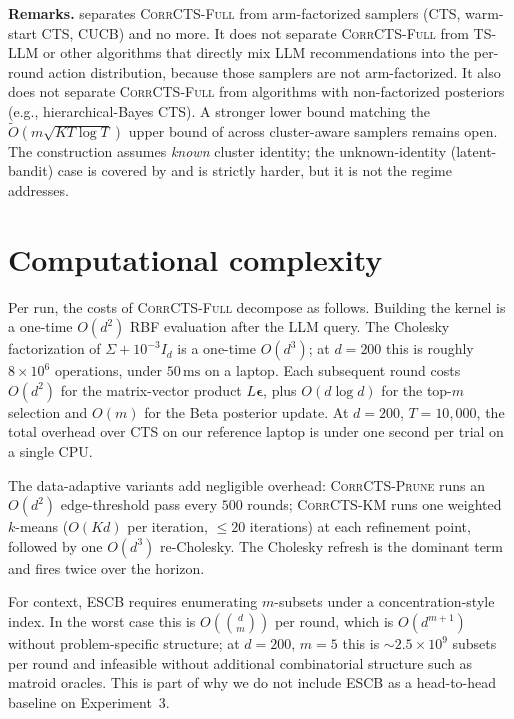 \documentclass{article}
\theoremstyle{plain}
\theoremstyle{definition}
\theoremstyle{remark}
\newcommand{\CorrFull}{\textsc{CorrCTS-Full}}
\newcommand{\EdgePrune}{\textsc{CorrCTS-Prune}}
\newcommand{\KMRefine}{\textsc{CorrCTS-KM}}
\begin{document}
\textbf{Remarks.}
 separates \CorrFull{} from arm-factorized samplers (CTS, warm-start CTS, CUCB) and no more.
It does not separate \CorrFull{} from TS-LLM or other algorithms that directly mix LLM recommendations into the per-round action distribution, because those samplers are not arm-factorized.
It also does not separate \CorrFull{} from algorithms with non-factorized posteriors (e.g., hierarchical-Bayes CTS).
A stronger lower bound matching the $\tilde O(m\sqrt{KT\log T})$ upper bound of  across cluster-aware samplers remains open.
The construction assumes \emph{known} cluster identity; the unknown-identity (latent-bandit) case is covered by \citet{hong2020latent} and is strictly harder, but it is not the regime  addresses.

\section{Computational complexity}\label{app:complexity}

Per run, the costs of \CorrFull{} decompose as follows.
Building the kernel is a one-time $O(d^2)$ RBF evaluation after the LLM query.
The Cholesky factorization of $\Sigma + 10^{-3} I_d$ is a one-time $O(d^3)$; at $d = 200$ this is roughly $8 \times 10^{6}$ operations, under $50\,\text{ms}$ on a laptop.
Each subsequent round costs $O(d^2)$ for the matrix-vector product $L\boldsymbol\epsilon$, plus $O(d \log d)$ for the top-$m$ selection and $O(m)$ for the Beta posterior update.
At $d = 200$, $T = 10{,}000$, the total overhead over CTS on our reference laptop is under one second per trial on a single CPU.

The data-adaptive variants add negligible overhead: \EdgePrune{} runs an $O(d^2)$ edge-threshold pass every $500$ rounds; \KMRefine{} runs one weighted $k$-means ($O(Kd)$ per iteration, ${\leq} 20$ iterations) at each refinement point, followed by one $O(d^3)$ re-Cholesky.
The Cholesky refresh is the dominant term and fires twice over the horizon.

For context, ESCB \citep{combes2015combinatorial} requires enumerating $m$-subsets under a concentration-style index.
In the worst case this is $O(\binom{d}{m})$ per round, which is $O(d^{m+1})$ without problem-specific structure; at $d = 200$, $m = 5$ this is $\sim 2.5 \times 10^{9}$ subsets per round and infeasible without additional combinatorial structure such as matroid oracles.
This is part of why we do not include ESCB as a head-to-head baseline on Experiment~3.
\end{document}
